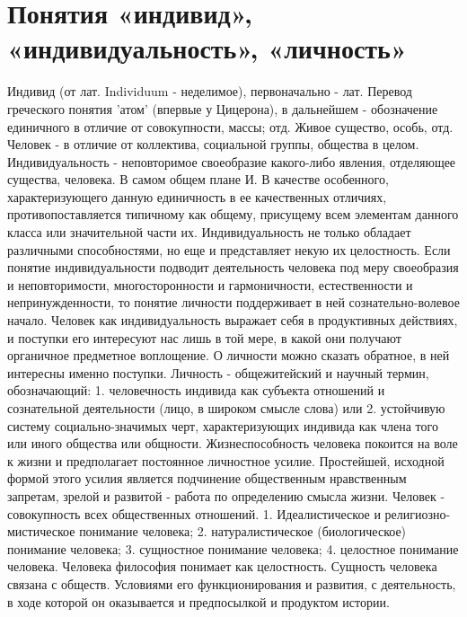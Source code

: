 \documentclass[12pt]{article}
\begin{document}
\section{Понятия «индивид», «индивидуальность», «личность»}
Индивид (от лат. Individuum - неделимое), первоначально - лат. Перевод греческого понятия 'атом' (впервые у
Цицерона), в дальнейшем - обозначение единичного в отличие от совокупности, массы; отд. Живое существо,
особь, отд. Человек - в отличие от коллектива, социальной группы, общества в целом.
Индивидуальность - неповторимое своеобразие какого-либо явления, отделяющее существа, человека. В самом
общем плане И. В качестве особенного, характеризующего данную единичность в ее качественных отличиях,
противопоставляется типичному как общему, присущему всем элементам данного класса или значительной
части их.
Индивидуальность  не  только  обладает  различными  способностями,  но  еще  и  представляет  некую  их
целостность.  Если  понятие  индивидуальности  подводит  деятельность  человека  под  меру  своеобразия  и
неповторимости,  многосторонности  и  гармоничности,  естественности  и  непринужденности,  то  понятие
личности поддерживает в ней сознательно-волевое начало. Человек как индивидуальность выражает себя в
продуктивных действиях, и поступки его интересуют нас лишь в той мере, в какой они получают органичное
предметное воплощение. О личности можно сказать обратное, в ней интересны именно поступки.
Личность - общежитейский и научный термин, обозначающий:
 1. человечность индивида как субъекта отношений и сознательной деятельности (лицо, в широком смысле
слова) или
  2. устойчивую систему социально-значимых черт, характеризующих индивида как члена того или иного
общества или общности. 
Жизнеспособность  человека  покоится  на  воле  к  жизни  и  предполагает  постоянное  личностное  усилие.
Простейшей,  исходной  формой  этого  усилия  является  подчинение  общественным  нравственным  запретам,
зрелой и развитой - работа по определению смысла жизни.
Человек - совокупность всех общественных отношений.
1. Идеалистическое и религиозно-мистическое понимание человека;
2. натуралистическое (биологическое) понимание человека;
3. сущностное понимание человека;
4. целостное понимание человека. 
Человека  философия  понимает  как  целостность.  Сущность  человека  связана  с  обществ.  Условиями  его
функционирования и развития, с деятельность, в ходе которой он оказывается и предпосылкой и продуктом
истории. 

\newpage
\end{document}
